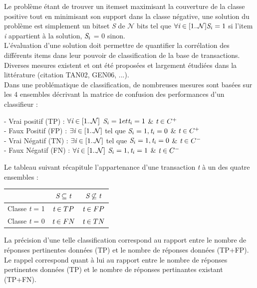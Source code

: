 \documentclass[a4paper,10pt]{report}
\begin{document}
	Le problème étant de trouver un itemset maximisant la couverture de la classe positive tout en minimisant son support dans la classe négative, une solution du problème est simplement un bitset \emph{S} de $\mathcal{N}$ bits tel que $\forall \emph{i} \in [1..\mathcal{N}] \emph{S}_{i} = 1$ si l'item \emph{i} appartient à la solution, $\emph{S}_{i}$ = 0 sinon. \\
	L'évaluation d'une solution doit permettre de quantifier la corrélation des différents items dans leur pouvoir de classification de la base de transactions. Diverses mesures existent et ont été proposées et largement étudiées dans la littérature (citation TAN02, GEN06, ...).\\
	Dans une problématique de classification, de nombreuses mesures sont basées sur les 4 ensembles décrivant la matrice de confusion des performances d'un classifieur :
\begin{center}
	- Vrai positif (TP) : $\forall \emph{i} \in [1..\mathcal{N}]$  $\emph{S}_{i} = 1 et \emph{t}_{i} = 1$ \&  $\emph{t} \in C^{+}$ \\
	- Faux Positif (FP) : $\exists \emph{i} \in [1..\mathcal{N}]$ tel que $\emph{S}_{i} = 1, \emph{t}_{i} = 0$ \&  $\emph{t} \in C^{+}$\\
	- Vrai Négatif (TN) : $\exists \emph{i} \in [1..\mathcal{N}]$ tel que $\emph{S}_{i} = 1, \emph{t}_{i} = 0$ \&  $\emph{t} \in C^{-}$\\
	- Faux Négatif (FN) : $\forall \emph{i} \in [1..\mathcal{N}]$ $\emph{S}_{i} = 1, \emph{t}_{i} = 1$ \&  $\emph{t} \in C^{-}$\\
\end{center}

 Le tableau suivant récapitule l'appartenance d'une transaction \emph{t} à un des quatre ensembles : 
	 
\begin{center}
	\begin{tabular}{|c|c|c|}
		\hline
		& $\emph{S} \subseteq \emph{t}$ & $\emph{S} \not\subseteq \emph{t}$ \\
		\hline
		Classe \emph{t} = 1 & $\emph{t} \in TP$ & $\emph{t} \in FP$ \\
		\hline
		Classe \emph{t} = 0 & $\emph{t} \in FN$ & $\emph{t} \in TN$ \\
		\hline
	\end{tabular}
\end{center}

La précision d'une telle classification correspond au rapport entre le nombre de réponses pertinentes données (TP) et le nombre de réponses données (TP+FP). Le rappel correspond quant à lui au rapport entre le nombre de réponses pertinentes données (TP) et le nombre de réponses pertinantes existant (TP+FN). 
\end{document}
